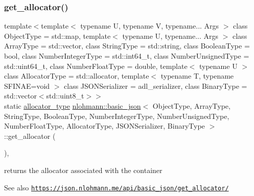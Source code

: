 \subsubsection{\texorpdfstring{get\+\_\+allocator()}{get\_allocator()}}
{\footnotesize\ttfamily template$<$template$<$ typename U, typename V, typename... Args $>$ class Object\+Type = std\+::map, template$<$ typename U, typename... Args $>$ class Array\+Type = std\+::vector, class String\+Type  = std\+::string, class Boolean\+Type  = bool, class Number\+Integer\+Type  = std\+::int64\+\_\+t, class Number\+Unsigned\+Type  = std\+::uint64\+\_\+t, class Number\+Float\+Type  = double, template$<$ typename U $>$ class Allocator\+Type = std\+::allocator, template$<$ typename T, typename S\+F\+I\+N\+A\+E=void $>$ class J\+S\+O\+N\+Serializer = adl\+\_\+serializer, class Binary\+Type  = std\+::vector$<$std\+::uint8\+\_\+t$>$$>$ \\
static \hyperlink{classnlohmann_1_1basic__json_ad38ae80f1e99d4b1f33c99fea4611457}{allocator\+\_\+type} \hyperlink{classnlohmann_1_1basic__json}{nlohmann\+::basic\+\_\+json}$<$ Object\+Type, Array\+Type, String\+Type, Boolean\+Type, Number\+Integer\+Type, Number\+Unsigned\+Type, Number\+Float\+Type, Allocator\+Type, J\+S\+O\+N\+Serializer, Binary\+Type $>$\+::get\+\_\+allocator (\begin{DoxyParamCaption}{ }\end{DoxyParamCaption})\hspace{0.3cm}{\ttfamily [inline]}, {\ttfamily [static]}}



returns the allocator associated with the container 

\begin{DoxySeeAlso}{See also}
\href{https://json.nlohmann.me/api/basic_json/get_allocator/}{\tt https\+://json.\+nlohmann.\+me/api/basic\+\_\+json/get\+\_\+allocator/} 
\end{DoxySeeAlso}
\mbox{\label{classnlohmann_1_1basic__json_aab19a246f6bcd27c195bed376cf5e138}} 
